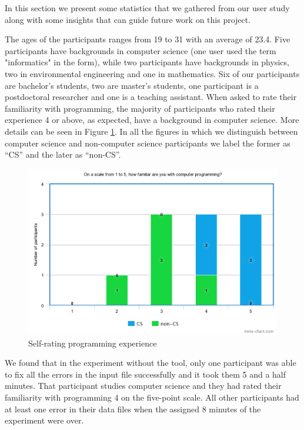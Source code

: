 \documentclass[10pt]{report}
\begin{document}
In this section we present some statistics that we gathered from our user study along with some insights that can guide future work on this project. 

The ages of the participants ranges from 19 to 31 with an average of 23.4. Five participants have backgrounds in computer science (one user used the term "informatics" in the form), while two participants have backgrounds in physics, two in environmental engineering and one in mathematics. Six of our participants are bachelor's students, two are master's students, one participant is a postdoctoral researcher and one is a teaching assistant. When asked to rate their familiarity with programming, the majority of participants who rated their experience 4 or above, as expected, have a background in computer science. More details can be seen in Figure \ref{rate}. In all the figures in which we distinguish between computer science and non-computer science participants we label the former as ``CS'' and the later as ``non-CS''. 

\begin{figure}[H]
	\includegraphics[width=\linewidth]{rate.png}
	\caption{Self-rating programming experience}
	\label{rate}
\end{figure}


We found that in the experiment without the tool, only one participant was able to fix all the errors in the input file successfully and it took them 5 and a half minutes. That participant studies computer science and they had rated their familiarity with programming 4 on the five-point scale. All other participants had at least one error in their data files when the assigned 8 minutes of the experiment were over. 
\end{document}
